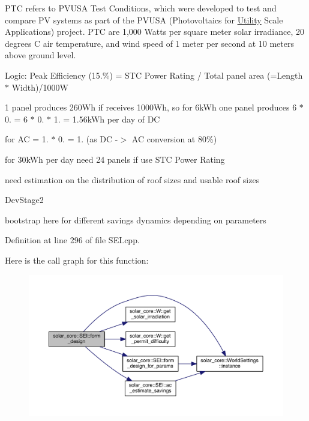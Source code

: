 P\+T\+C refers to P\+V\+U\+S\+A Test Conditions, which were developed to test and compare P\+V systems as part of the P\+V\+U\+S\+A (Photovoltaics for \hyperlink{classsolar__core_1_1_utility}{Utility} Scale Applications) project. P\+T\+C are 1,000 Watts per square meter solar irradiance, 20 degrees C air temperature, and wind speed of 1 meter per second at 10 meters above ground level.

Logic\+: Peak Efficiency (15.\%) = S\+T\+C Power Rating / Total panel area (=Length $\ast$ Width)/1000\+W

1 panel produces 260\+Wh if receives 1000\+Wh, so for 6k\+Wh one panel produces 6 $\ast$ 0. = 6 $\ast$ 0. $\ast$ 1. = 1.\+56k\+Wh per day of D\+C

for A\+C = 1. $\ast$ 0. = 1. (as D\+C -\/$>$ A\+C conversion at 80\%)

for 30k\+Wh per day need 24 panels if use S\+T\+C Power Rating

need estimation on the distribution of roof sizes and usable roof sizes \begin{DoxyRefDesc}{Dev\+Stage2}
\item[\hyperlink{_dev_stage2__DevStage2000015}{Dev\+Stage2}]bootstrap here for different savings dynamics depending on parameters \end{DoxyRefDesc}


Definition at line 296 of file S\+E\+I.\+cpp.



Here is the call graph for this function\+:
\nopagebreak
\begin{figure}[H]
\begin{center}
\leavevmode
\includegraphics[width=350pt]{classsolar__core_1_1_s_e_i_a807561ad055ddc0df91b80ba406ee6df_cgraph}
\end{center}
\end{figure}




